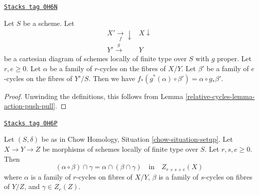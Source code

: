 \begin{lemma}
\label{relative-cycles-lemma-construction-push-pull}
\href{https://stacks.math.columbia.edu/tag/0H6N}{\texttt{Stacks tag 0H6N}}

Let $S$ be a scheme. Let
$$
\begin{array}{cc}X' \underset{f}{\longrightarrow}\downarrow & X \downarrow \\ Y' \overset{g}{\longrightarrow} & Y\end{array}
$$
be a cartesian diagram of schemes locally of finite type over $S$
with $g$ proper. Let $r, e \geq 0$. Let $\alpha$ be a family of
$r$-cycles on the fibres of $X/Y$. Let $\beta'$ be a family of
$e$-cycles on the fibres of $Y'/S$. Then we have
$f_*(g^*(\alpha) \circ \beta') = \alpha \circ g_*\beta'$.
\end{lemma}

\begin{proof}
Unwinding the definitions, this follows from
Lemma \ref{relative-cycles-lemma-action-push-pull}.
\end{proof}

\begin{lemma}
\label{relative-cycles-lemma-construction-composition}
\href{https://stacks.math.columbia.edu/tag/0H6P}{\texttt{Stacks tag 0H6P}}

Let $(S, \delta)$ be as in Chow Homology, Situation \ref{chow-situation-setup}.
Let $X \to Y \to Z$ be morphisms of schemes locally of finite type over $S$.
Let $r, s, e \geq 0$. Then
$$
(\alpha \circ \beta) \cap \gamma = \alpha \cap (\beta \cap \gamma)
\quad\text{in}\quad Z_{r + s + e}(X)
$$
where $\alpha$ is a family of $r$-cycles on fibres of $X/Y$,
$\beta$ is a family of $s$-cycles on fibres of $Y/Z$, and $\gamma \in Z_e(Z)$.
\end{lemma}

